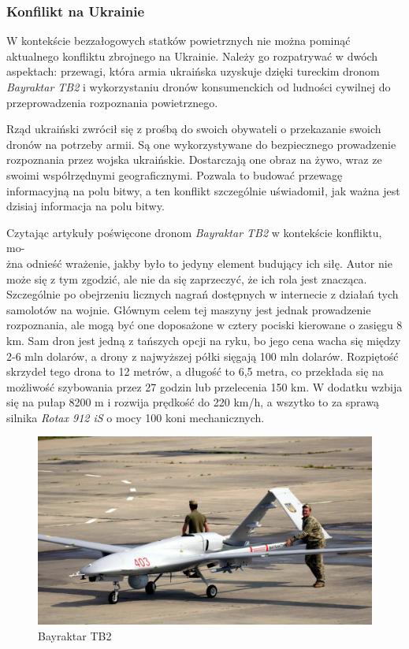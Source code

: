 \subsubsection{Konfilikt na Ukrainie}
W kontekście bezzałogowych statków powietrznych nie można pominąć aktualnego konfliktu zbrojnego na Ukrainie. Należy go rozpatrywać w dwóch aspektach: przewagi, która armia ukraińska uzyskuje dzięki tureckim dronom \textit{Bayraktar TB2} i wykorzystaniu dronów konsumenckich od ludności cywilnej do przeprowadzenia rozpoznania powietrznego.

Rząd ukraiński zwrócił się z prośbą do swoich obywateli o przekazanie swoich dronów na potrzeby armii. Są one wykorzystywane do bezpiecznego prowadzenie rozpoznania przez wojska ukraińskie. Dostarczają one obraz na żywo, wraz ze swoimi współrzędnymi geograficznymi. Pozwala to budować przewagę informacyjną na polu bitwy, a ten konflikt szczególnie uświadomił, jak ważna jest dzisiaj informacja na polu bitwy.\cite{fotografia-drony-ukraina}

Czytając artykuły poświęcone dronom \textit{Bayraktar TB2} w kontekście konfliktu, mo-\\żna odnieść wrażenie, jakby było to jedyny element budujący ich siłę. Autor nie może się z tym zgodzić, ale nie da się zaprzeczyć, że ich rola jest znacząca. Szczególnie po obejrzeniu licznych nagrań dostępnych w internecie z działań tych samolotów na wojnie. Głównym celem tej maszyny jest jednak prowadzenie rozpoznania, ale mogą być one doposażone w cztery pociski kierowane o zasięgu 8 km. Sam dron jest jedną z tańszych opcji na ryku, bo jego cena wacha się między 2-6 mln dolarów, a drony z najwyższej półki sięgają 100 mln dolarów. Rozpiętość skrzydeł tego drona to 12 metrów, a długość to 6,5 metra, co przekłada się na możliwość szybowania przez 27 godzin lub przelecenia 150 km. W dodatku wzbija się na pułap 8200 m i rozwija prędkość do 220 km/h, a wszytko to za sprawą silnika \textit{Rotax 912 iS} o mocy 100 koni mechanicznych.\cite{bayraktar-chip}\cite{bayraktar-pap}

\begin{figure}[!ht]
\begin{center}
  \includegraphics[width=12cm]{./Obrazy/Bayraktar_TB2_ukraina.jpg}
  \caption{Bayraktar TB2}
\end{center}
\end{figure}


